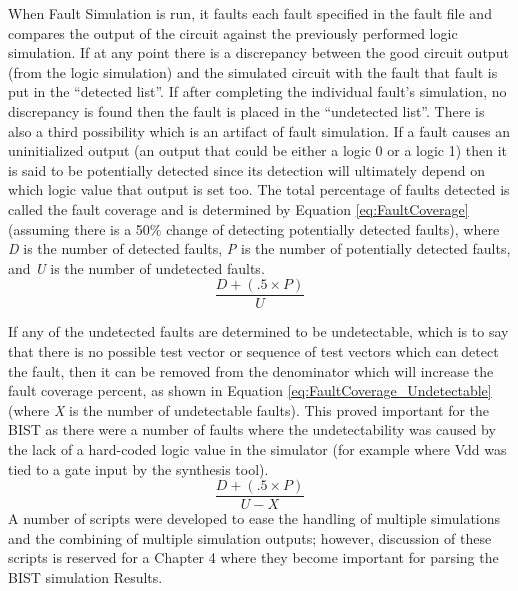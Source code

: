 \documentclass[12pt]{report}
\begin{document}
When Fault Simulation is run, it faults each fault specified in the fault file and compares the output of the circuit against the previously performed logic simulation.  If at any point there is a discrepancy between the good circuit output (from the logic simulation) and the simulated circuit with the fault that fault is put in the ``detected list''.  If after completing the individual fault's simulation, no discrepancy is found then the fault is placed in the ``undetected list''.  There is also a third possibility which is an artifact of fault simulation.  If a fault causes an uninitialized output (an output that could be either a logic 0 or a logic 1) then it is said to be potentially detected since its detection will ultimately depend on which logic value that output is set too.  The total percentage of faults detected is called the fault coverage and is determined by Equation \ref{eq:FaultCoverage} (assuming there is a 50\% change of detecting potentially detected faults), where \textit{D} is the number of detected faults, \textit{P} is the number of potentially detected faults, and \textit{U} is the number of undetected faults\cite{stroud}.
\begin{equation}
\frac{D + (.5 \times P)}{U}
\label{eq:FaultCoverage}
\end{equation}

If any of the undetected faults are determined to be undetectable, which is to say that there is no possible test vector or sequence of test vectors which can detect the fault, then it can be removed from the denominator which will increase the fault coverage percent, as shown in Equation \ref{eq:FaultCoverage_Undetectable} (where \textit{X} is the number of undetectable faults).   This proved important for the BIST as there were a number of faults where the undetectability was caused by the lack of a hard-coded logic value in the simulator (for example where Vdd was tied to a gate input by the synthesis tool).
\begin{equation}
\frac{D + (.5 \times P)}{U-X}
\label{eq:FaultCoverage_Undetectable}
\end{equation}
A number of scripts were developed to ease the handling of multiple simulations and the combining of multiple simulation outputs; however, discussion of these scripts is reserved for a Chapter 4 where they become important for parsing the BIST simulation Results.
\end{document}
